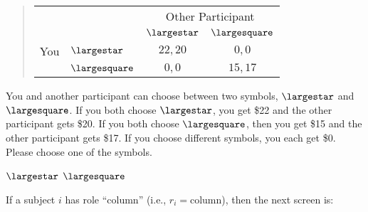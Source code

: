 \documentclass[11pt]{article}
\begin{document}
\begin{tcolorbox}
\begin{quote}
\begin{center}
\begin{tabular}{llcc}
    & & \multicolumn{2}{c}{Other Participant}  \\
& & $\largestar$ & $\largesquare$  \\ \cline{3-4}
You & $\largestar$ & \multicolumn{1}{|c|}{$22,20$} & \multicolumn{1}{c|}{$0,0$}  \\ \cline{3-4}
& $\largesquare$ & \multicolumn{1}{|c|}{$0,0$} & \multicolumn{1}{c|}{$15,17$}  \\ \cline{3-4}
\end{tabular}
\end{center}
\end{quote}

You and another participant can choose between two symbols, $\largestar$ and $\largesquare$. If you both choose $\largestar$, you get \$22 and the other participant gets \$20. If you both choose $\largesquare$, then you get \$15 and the other participant gets \$17. If you choose different symbols, you each get \$0.\\

Please choose one of the symbols.\\


\begin{center}
$\largestar$ \qquad $\largesquare$
\end{center}
\end{tcolorbox}

If a subject $i$ has role ``column'' (i.e., $r_i=\text{column}$), then the next screen is:
\end{document}
